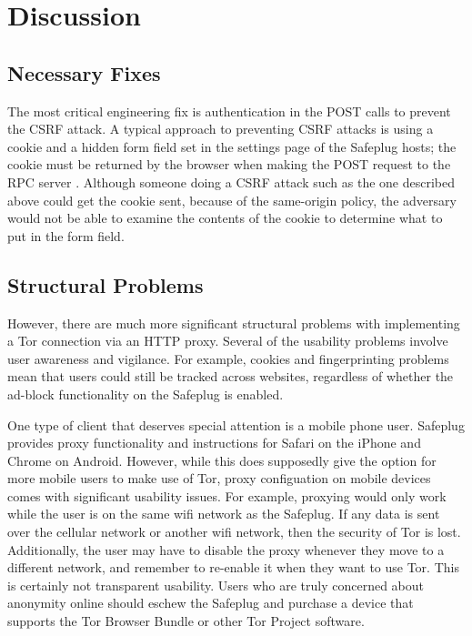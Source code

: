 \documentclass[letterpaper,twocolumn,10pt]{article}
\begin{document}
\section{Discussion}
\subsection{Necessary Fixes}
The most critical engineering fix is authentication in the POST calls to prevent the CSRF attack.  A typical approach to preventing CSRF attacks is using a cookie and a hidden form field set in the settings page of the Safeplug hosts; the cookie must be returned by the browser when making the POST request to the RPC server \cite{csrfdef}.  Although someone doing a CSRF attack such as the one described above could get the cookie sent, because of the same-origin policy, the adversary would not be able to examine the contents of the cookie to determine what to put in the form field.

\subsection{Structural Problems}
However, there are much more significant structural problems with implementing a Tor connection via an HTTP proxy.  Several of the usability problems involve user awareness and vigilance.  For example, cookies and fingerprinting problems mean that users could still be tracked across websites, regardless of whether the ad-block functionality on the Safeplug is enabled.  

One type of client that deserves special attention is a mobile phone user.  Safeplug provides proxy functionality and instructions for Safari on the iPhone and Chrome on Android.  However, while this does supposedly give the option for more mobile users to make use of Tor, proxy configuation on mobile devices comes with significant usability issues.  For example, proxying would only work while the user is on the same wifi network as the Safeplug.  If any data is sent over the cellular network or another wifi network, then the security of Tor is lost.  Additionally, the user may have to disable the proxy whenever they move to a different network, and remember to re-enable it when they want to use Tor.  This is certainly not transparent usability.  Users who are truly concerned about anonymity online should eschew the Safeplug and purchase a device that supports the Tor Browser Bundle or other Tor Project software.
\end{document}
